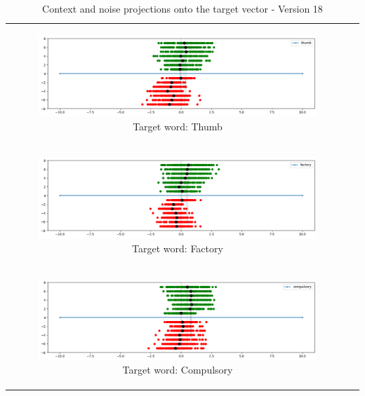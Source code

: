 \begin{table}[p]
  \centering
  \begin{tabular}{cc}
    \begin{subfigure}{0.95\textwidth}
      \includegraphics[width=\linewidth]{img/thumb_v18.png}
      \caption{Target word: Thumb}
    \end{subfigure} \\
    \begin{subfigure}{0.95\textwidth}
      \includegraphics[width=\linewidth]{img/factory_v18.png}
      \caption{Target word: Factory}
    \end{subfigure} \\
    \begin{subfigure}{0.95\textwidth}
      \includegraphics[width=\linewidth]{img/compulsory_v18.png}
      \caption{Target word: Compulsory}
    \end{subfigure} 
  \end{tabular}
  \caption{Context and noise projections onto the target vector - Version 18}
  \label{tab:v18_projections}
\end{table}


